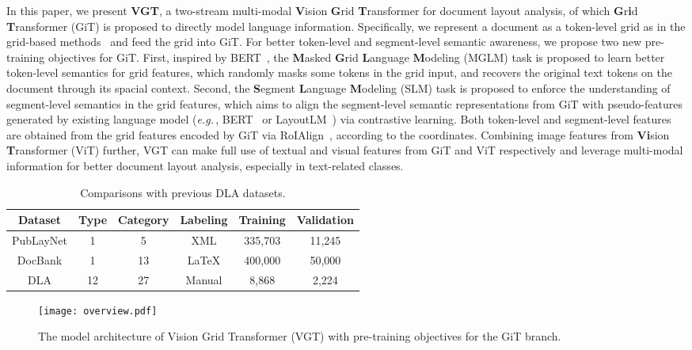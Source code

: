 \documentclass[10pt,twocolumn,letterpaper]{article}
\def\eg{\emph{e.g.}\,}
\newcommand{\ra}[1]{\renewcommand{\arraystretch}{#1}}
\begin{document}
In this paper, we present \textbf{VGT}, a two-stream multi-modal \textbf{V}ision \textbf{G}rid \textbf{T}ransformer for document layout analysis,
of which \textbf{G}r\textbf{i}d \textbf{T}ransformer (GiT) is proposed to directly model  language information.
Specifically, we represent a document as a   token-level grid as in the grid-based methods~\cite{yang2017learning,kaplan2021combining,zhang2021vsr} 
and feed the grid into GiT.
For better token-level and segment-level semantic awareness,
we propose two new pre-training objectives for GiT. 
First, inspired by BERT~\cite{devlin2018bert}, the \textbf{M}asked \textbf{G}rid \textbf{L}anguage \textbf{M}odeling (MGLM) task is proposed to learn better token-level semantics for grid features,
which randomly masks some tokens in the  grid input, and recovers the original text tokens on the document through its  spacial context.
Second, the \textbf{S}egment \textbf{L}anguage \textbf{M}odeling (SLM) task is proposed to enforce the understanding of segment-level semantics in the grid features,
which aims to align the segment-level semantic representations from GiT with pseudo-features generated by existing language model (\eg, BERT~\cite{bao2021beit} or LayoutLM~\cite{xu2020layoutlm}) via contrastive learning.
Both token-level and segment-level features are obtained from the  grid features encoded by GiT via RoIAlign~\cite{he2017mask}, according to the coordinates.
Combining image features from \textbf{Vi}sion \textbf{T}ransformer (ViT) further,
VGT can make full use of textual and visual features from GiT and ViT respectively 
and leverage multi-modal information for better document layout analysis, especially in text-related classes.


\begin{table}[t]\centering
\small
\setlength{\tabcolsep}{2pt}
\ra{1.2}
\caption{Comparisons with previous DLA datasets.}
\label{tab:datasets}
\begin{tabular}{cccccc}
\toprule[1pt]
\textbf{Dataset} & \textbf{Type} & \textbf{Category} & \textbf{Labeling} &\textbf{Training} & \textbf{Validation} \\
\midrule
PubLayNet &1 & 5	&XML &335,703	&11,245	 \\
DocBank & 1 & 13	&\LaTeX &400,000	&50,000 \\
DLA & 12 & 27	&Manual &8,868	&	2,224 \\
\bottomrule[1pt]
\end{tabular}
\end{table}

\begin{figure*}[!htp]\centering
\texttt{[image: overview.pdf]}
\caption{The model architecture of Vision Grid Transformer (VGT) with pre-training objectives for the GiT branch.}
 \label{fig:overview}
\end{figure*}
\end{document}
